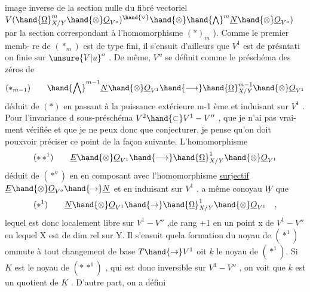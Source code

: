
image inverse de la section nulle du fibré vectoriel $V(\hand{\underline{\Omega}}^m_{X/Y}\hand{\otimes}\underline{O}_{V^o})^{\hand{\vee}}\hand{\otimes}\hand{\bigwedge}^m\underline{N}\hand{\otimes}\underline{O}_{V^o})$
par la section correspondant à l'homomorphisme $(*)_{m}$ ). Comme le premier memb-%
re de $(*_m)$ est de type fini, il s'ensuit d'ailleurs que $V^1$ est de présntati%
on finie sur $\unsure{V|u}^o$ . De même, $V''$ se définit comme le préschéma des zéros de
\[ (*_{m-1}) \qquad \hand{\bigwedge}^{m-1}\underline{N}\hand{\otimes}\underline{O}_{V^1} \hand{\longrightarrow} \hand{\underline{\Omega}}^{m-1}_{X/Y}\hand{\otimes}\underline{O}_{V^1} \]
déduit de $(*)$ en passant à la puissance extérieure m-1 ème et induisant sur
$V^1$ . Pour l'invariance d sous-préschéma $V^2\hand{\subset} V^1-V''$ , que je n'ai pas vrai-%
ment vérifiée et que je ne peux donc que conjecturer, je pense qu'on doit
pouxvoir préciser ce point de la façon suivante. L'homomorphisme
\[ (*\,*^1) \qquad \underline{E}\hand{\otimes}\underline{O}_{V^1}\hand{\longrightarrow}\hand{\underline{\Omega}}^1_{X/Y}\hand{\otimes}\underline{O}_{V^1} \]
déduit de $(*^o)$ en  en composant avec l'homomorphisme
\uline{surjectif} $\underline{E}\hand{\otimes}\underline{O}_{V^o}\hand{\to}\underline{N}$ et en  induisant sur $V^1$ , a même conoyau
$\underline{W}$ que
\[ (*^1) \qquad \underline{N}\hand{\otimes}\underline{O}_{V^1}\hand{\to}\hand{\underline{\Omega}}^1_{X/Y}\hand{\otimes}\underline{O}_{V^1} \quad , \]
lequel  est donc localement libre sur $V^1-V''$ ,\hand{(}de rang +1 en un point
x de $V^1-V''$ en lequel X est de dim rel  sur Y\hand{)}. Il s'ensuit quela formation
du noyau de $(*^1)$ ommute à tout changement de base $T\hand{\to} V^1$ oit $\underline{k}$ le
noyau de $(*^1)$. Si $\underline{K}$ est le noyau de $(*\,*^1)$ , qui est donc inversible sur
$V^1-V''$ , on voit  que $\underline{k}$ est un quotient de $\underline{K}$ . D'autre part, on a défini
